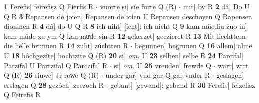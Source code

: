 \documentclass[8pt,a4paper,notitlepage]{article}
\begin{document}
\begin{table}[ht]
\begin{minipage}[t]{0.5\linewidth}
\textbf{1} Ferefis] feirefisz Q Fierfis R  $\cdot$ vuorte si] sie furte Q (R)  $\cdot$ mit] by R \textbf{2} dâ] Do U Q R \textbf{3} Repansen de joien] Repansen de ioien U Repansen deschoyen Q Rapensen dioninen R \textbf{4} dâ] do U Q R \textbf{8} ich niht] [icht]: ich nicht Q \textbf{9} kam müediu zuo in] kam múde zu ym Q kan muͯde sin R \textbf{12} gekerzet] geczieret R \textbf{13} Mit liechttern die helle brunnen R \textbf{14} zuht] zúchtten R  $\cdot$ begunnen] begrunen Q \textbf{16} allem] alme U \textbf{18} hôchgezîte] hochtzite Q (R) \textbf{20} si] \textit{om.} U \textbf{23} selben] selbe R \textbf{24} Parcifal] Parzifal U Partzifal Q Parczifal R  $\cdot$ si] \textit{om.} U \textbf{25} vreuden] frewde Q  $\cdot$ wart] wirt Q (R) \textbf{26} riuwe] Jr rew͑e Q (R)  $\cdot$ under gar] vnd gar Q gar vnder R  $\cdot$ geslagen] erslagen Q \textbf{28} gezôch] zeczoch R  $\cdot$ gebant] [gewand]: geband R \textbf{30} Ferefis] feizefisz Q Feirefis R \newline
\end{minipage}
\end{table}
\end{document}
